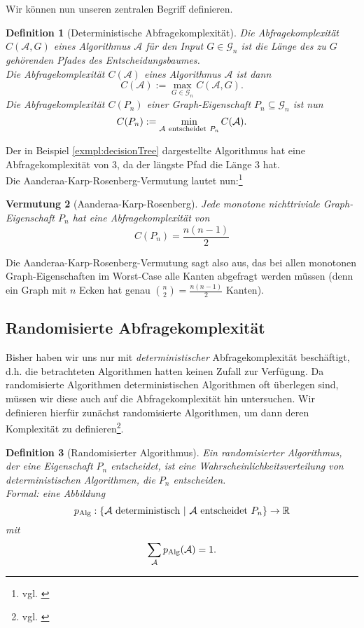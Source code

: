 \documentclass[10pt,a4paper, footheight=1mm]{scrreprt}
\newtheorem{definition}{Definition}
\newtheorem{conjecture}[definition]{Vermutung}
\theoremstyle{definition}
\begin{document}
Wir können nun unseren zentralen Begriff definieren.

\begin{definition}[Deterministische Abfragekomplexität]
Die \emph{Abfragekomplexität} $C(\mathcal{A},G)$ eines
Algorithmus $\mathcal{A}$ für den Input $G\in \mathcal{G}_n$ ist
die Länge des zu $G$ gehörenden Pfades des
Entscheidungsbaumes. \\
Die \emph{Abfragekomplexität} $C(\mathcal{A})$ eines
Algorithmus $\mathcal{A}$ ist dann
$$ C(\mathcal{A}) := \max_{G \in \mathcal{G}_n} C(\mathcal{A},G).$$
Die \emph{Abfragekomplexität} $C(P_n)$ einer Graph-Eigenschaft
$P_n\subseteq \mathcal{G}_n$ ist nun
$$ C(P_n) := \min_{\mathcal{A} \ {\rm entscheidet}\  P_n} C(\mathcal{A}).$$
\end{definition}

Der in Beispiel \ref{exmpl:decisionTree} dargestellte
Algorithmus hat eine Abfragekomplexität von $3$, da
der längste Pfad die Länge $3$ hat. \\
Die Aanderaa-Karp-Rosenberg-Vermutung lautet nun:\footnote{vgl. \cite[S.9]{Lovasz}}
\begin{conjecture}[Aanderaa-Karp-Rosenberg]
Jede monotone nichttriviale Graph-Eigenschaft $P_n$
hat eine Abfragekomplexität von
$$C(P_n) = \frac{n(n-1)}{2}$$
\end{conjecture}
Die Aanderaa-Karp-Rosenberg-Vermutung sagt also aus,
das bei allen monotonen Graph-Eigenschaften im Worst-Case
alle Kanten abgefragt werden müssen (denn ein Graph mit
$n$ Ecken hat genau ${\binom{n}{2}=\frac{n(n-1)}{2}}$ Kanten).

\subsection{Randomisierte Abfragekomplexität}

Bisher haben wir uns nur mit \emph{deterministischer}
Abfragekomplexität beschäftigt, d.h. die betrachteten
Algorithmen hatten keinen Zufall zur Verfügung.
Da randomisierte Algorithmen deterministischen Algorithmen
oft überlegen sind, müssen wir diese auch auf
die Abfragekomplexität hin untersuchen.
Wir definieren hierfür zunächst randomisierte Algorithmen,
um dann deren Komplexität zu definieren\footnote{vgl.
\cite[S.120]{Groeger}}.
\begin{definition}[Randomisierter Algorithmus]
Ein \emph{randomisierter Algorithmus}, der eine
Eigenschaft $P_n$ entscheidet, ist eine
Wahrscheinlichkeitsverteilung von deterministischen
Algorithmen, die $P_n$ entscheiden. \\
Formal: eine Abbildung
$$ p_\textup{Alg}: \{ \mathcal{A} \ \textup {deterministisch} \ | \
         \mathcal{A} \ {\rm entscheidet} \ P_n \} \to \mathbb{R} $$
mit 
$$\sum_\mathcal{A} p_\textup{Alg}(\mathcal{A}) = 1.$$
\end{definition}
\end{document}
